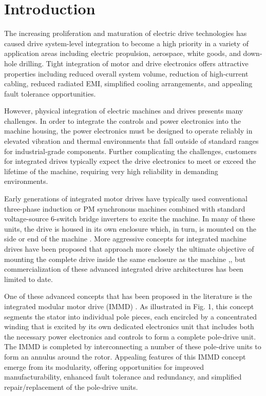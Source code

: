 \chapter{Introduction}
The increasing proliferation and maturation of electric drive technologies has
caused drive system-level integration to become a high priority in a variety
of application areas including electric propulsion, aerospace, white goods,
and down-hole drilling.
Tight integration of motor and drive electronics
offers attractive properties including reduced overall system volume,
reduction of high-current cabling, reduced radiated EMI, simplified cooling
arrangements, and appealing fault tolerance opportunities.

However, physical integration of electric machines and drives presents many
challenges.
In order to integrate the controls and power electronics into the
machine housing, the power electronics must be designed to operate reliably in
elevated vibration and thermal environments that fall outside of standard
ranges for industrial-grade components.
Further complicating the
challenges, customers for integrated drives typically expect the drive
electronics to meet or exceed the lifetime of the machine, requiring very high
reliability in demanding environments.

Early generations of integrated motor drives have typically used conventional
three-phase induction or PM synchronous machines combined with standard
voltage-source 6-switch bridge inverters to excite the machine.
In many of
these units, the drive is housed in its own enclosure which, in turn, is
mounted on the side or end of the machine .
More aggressive concepts for
integrated machine drives have been proposed that approach more closely the
ultimate objective of mounting the complete drive inside the same enclosure as
the machine ,, but commercialization of these advanced integrated drive
architectures has been limited to date.

One of these advanced concepts that has been proposed in the literature is the
integrated modular motor drive (IMMD) .
As illustrated in Fig. 1, this
concept segments the stator into individual pole pieces, each encircled by a
concentrated winding that is excited by its own dedicated electronics unit
that includes both the necessary power electronics and controls to form a
complete pole-drive unit.
The IMMD is completed by interconnecting a number
of these pole-drive units to form an annulus around the rotor.
Appealing features of this IMMD concept emerge from its modularity, offering
opportunities for improved manufacturability, enhanced fault tolerance and
redundancy, and simplified repair/replacement of the pole-drive units.

